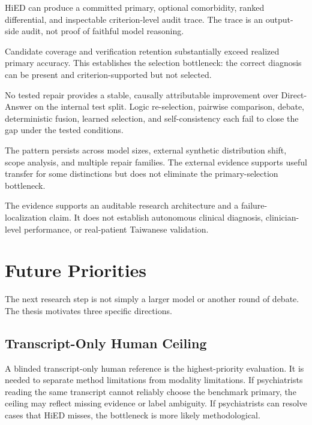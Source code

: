 \begin{description}[style=nextline,leftmargin=3cm,labelwidth=2.5cm]
\item[RQ1] HiED can produce a committed primary, optional comorbidity, ranked differential, and inspectable criterion-level audit trace. The trace is an output-side audit, not proof of faithful model reasoning.

\item[RQ2] Candidate coverage and verification retention substantially exceed realized primary accuracy. This establishes the selection bottleneck: the correct diagnosis can be present and criterion-supported but not selected.

\item[RQ3] No tested repair provides a stable, causally attributable improvement over Direct-Answer on the internal test split. Logic re-selection, pairwise comparison, debate, deterministic fusion, learned selection, and self-consistency each fail to close the gap under the tested conditions.

\item[RQ4] The pattern persists across model sizes, external synthetic distribution shift, scope analysis, and multiple repair families. The external evidence supports useful transfer for some distinctions but does not eliminate the primary-selection bottleneck.

\item[RQ5] The evidence supports an auditable research architecture and a failure-localization claim. It does not establish autonomous clinical diagnosis, clinician-level performance, or real-patient Taiwanese validation.
\end{description}

\section{Future Priorities}

The next research step is not simply a larger model or another round of debate. The thesis motivates three specific directions.

\subsection{Transcript-Only Human Ceiling}

A blinded transcript-only human reference is the highest-priority evaluation. It is needed to separate method limitations from modality limitations. If psychiatrists reading the same transcript cannot reliably choose the benchmark primary, the ceiling may reflect missing evidence or label ambiguity. If psychiatrists can resolve cases that HiED misses, the bottleneck is more likely methodological.

